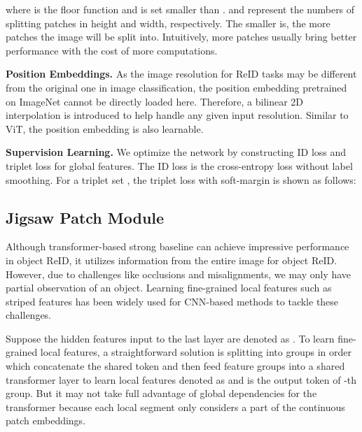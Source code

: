 \documentclass[10pt,twocolumn,letterpaper]{article}
\begin{document}
where  is the floor function and  is set smaller than .  and  represent the numbers of splitting patches in height and width, respectively. 
The smaller  is, the more patches the image will be split into. 
Intuitively, more patches usually bring better performance with the cost of more computations. 

\textbf{Position Embeddings.} As the image resolution for ReID tasks may be different from the original one in image classification, the position embedding pretrained on ImageNet cannot be directly loaded here. Therefore, a bilinear 2D interpolation is introduced to help handle any given input resolution. Similar to ViT, the position embedding is also learnable.

\textbf{Supervision Learning.} 
We optimize the network by constructing ID loss and triplet loss for global features. The ID loss  is the cross-entropy loss without label smoothing. For a triplet set , the triplet loss  with soft-margin is shown as follows: 






\subsection{Jigsaw Patch Module}\label{ssec:jpm}


Although transformer-based strong baseline can achieve impressive performance in object ReID, it utilizes information from the entire image for object ReID. However, due to challenges like occlusions and misalignments, we may only have partial observation of an object. Learning fine-grained local features such as striped features has been widely used for CNN-based methods to tackle these challenges. 

Suppose the hidden features input to the last layer are denoted as . To learn fine-grained local features, a straightforward solution is splitting  into  groups in order which concatenate the shared token  and then feed  feature groups into a shared transformer layer to learn  local features denoted as  and  is the output token of -th group.
But it may not take full advantage of global dependencies for the transformer because each local segment only considers a part of the continuous patch embeddings. 
\end{document}
